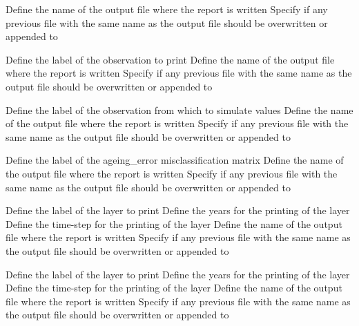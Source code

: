  {Define the name of the output file where the report is written}
 {Specify if any previous file with the same name as the output file should be overwritten or appended to}
\par\textbf{}\par
{} {Define the label of the observation to print}
 {Define the name of the output file where the report is written}
 {Specify if any previous file with the same name as the output file should be overwritten or appended to}
\par\textbf{}\par
{} {Define the label of the observation from which to simulate values}
 {Define the name of the output file where the report is written}
 {Specify if any previous file with the same name as the output file should be overwritten or appended to}
\par\textbf{}\par
{} {Define the label of the ageing\_error misclassification matrix}
 {Define the name of the output file where the report is written}
 {Specify if any previous file with the same name as the output file should be overwritten or appended to}
\par\textbf{}\par
{} {Define the label of the layer to print}
 {Define the years for the printing of the layer}
 {Define the time-step for the printing of the layer}
 {Define the name of the output file where the report is written}
 {Specify if any previous file with the same name as the output file should be overwritten or appended to}
\par\textbf{}\par
{} {Define the label of the layer to print}
 {Define the years for the printing of the layer}
 {Define the time-step for the printing of the layer}
 {Define the name of the output file where the report is written}
 {Specify if any previous file with the same name as the output file should be overwritten or appended to}
